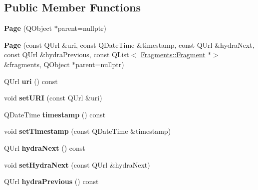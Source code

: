 \subsection*{Public Member Functions}
\begin{DoxyCompactItemize}
\item 
\mbox{\label{classFragments_1_1Page_af61cfda59ee42caa75e373471ac91ae6}} 
{\bfseries Page} (Q\+Object $\ast$parent=nullptr)
\item 
\mbox{\label{classFragments_1_1Page_ac345c0f46af8796c9f7fa702f71f240c}} 
{\bfseries Page} (const Q\+Url \&uri, const Q\+Date\+Time \&timestamp, const Q\+Url \&hydra\+Next, const Q\+Url \&hydra\+Previous, const Q\+List$<$ \mbox{\hyperlink{classFragments_1_1Fragment}{Fragments\+::\+Fragment}} $\ast$$>$ \&fragments, Q\+Object $\ast$parent=nullptr)
\item 
\mbox{\label{classFragments_1_1Page_a1185c1fb78c1d28eee03dba926fefcb8}} 
Q\+Url {\bfseries uri} () const
\item 
\mbox{\label{classFragments_1_1Page_a13d34067ae20ee41b3003a6c2084fe2c}} 
void {\bfseries set\+U\+RI} (const Q\+Url \&uri)
\item 
\mbox{\label{classFragments_1_1Page_a44cf4faf8776d3344bc4296d37b1f7ae}} 
Q\+Date\+Time {\bfseries timestamp} () const
\item 
\mbox{\label{classFragments_1_1Page_a5f771039432d7c46a7da56d34474bb8a}} 
void {\bfseries set\+Timestamp} (const Q\+Date\+Time \&timestamp)
\item 
\mbox{\label{classFragments_1_1Page_a822bbc500bf1e5540582cdf258d73b20}} 
Q\+Url {\bfseries hydra\+Next} () const
\item 
\mbox{\label{classFragments_1_1Page_a241195084d7c53ce0c8ad2fff67d9698}} 
void {\bfseries set\+Hydra\+Next} (const Q\+Url \&hydra\+Next)
\item 
\mbox{\label{classFragments_1_1Page_a102aada029299dbe7f8b55116eda0933}} 
Q\+Url {\bfseries hydra\+Previous} () const
$$
\end{DoxyCompactItemize}

